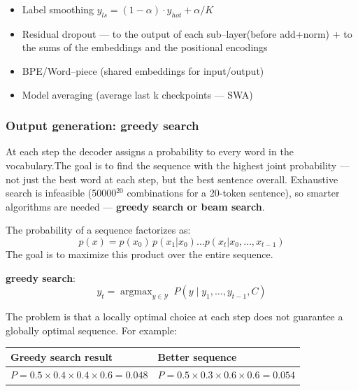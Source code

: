 \documentclass[10pt]{article}
\begin{document}
\begin{itemize}
    \item Label smoothing
    $y_{ls} = (1-\alpha)\cdot y_{hot}+\alpha/K$
    \item Residual dropout --- to the output of each sub--layer(before add+norm) + to the sums of the embeddings and the positional encodings
    \item BPE/Word--piece (shared embeddings for input/output)
    \item Model averaging (average last k checkpoints --- SWA)
\end{itemize}

\subsubsection{Output generation: greedy search}
At each step the decoder assigns a probability to every word in the vocabulary.The goal is to find the sequence with the highest joint probability ---not just the best word at each step, but the best sentence overall. Exhaustive search is infeasible (50000$^{20}$ combinations for a 20-token sentence), so smarter algorithms are needed --- \textbf{greedy search or beam search}.

The probability of a sequence factorizes as:
\begin{equation*}
p(x) = p(x_0)\, p(x_1 | x_0) \ldots p(x_t | x_0, \ldots, x_{t-1})
\end{equation*}
The goal is to maximize this product over the entire sequence.

\textbf{greedy search}:
\begin{equation*}
y_t = \operatorname{argmax}_{y \in \mathcal{Y}}\ P(y \mid y_1, \ldots, y_{t-1}, C)
\end{equation*}

The problem is that a locally optimal choice at each step does not guarantee a globally optimal sequence. For example:

\begin{center}
\renewcommand{\arraystretch}{1.3}
\begin{tabular}{|m{5cm}|m{5cm}|}
\hline
\textbf{Greedy search result} & \textbf{Better sequence} \\
\hline
$P = 0.5 \times 0.4 \times 0.4 \times 0.6 = 0.048$ &
$P = 0.5 \times 0.3 \times 0.6 \times 0.6 = 0.054$ \\
\hline
\end{tabular}
\end{center}
\end{document}
